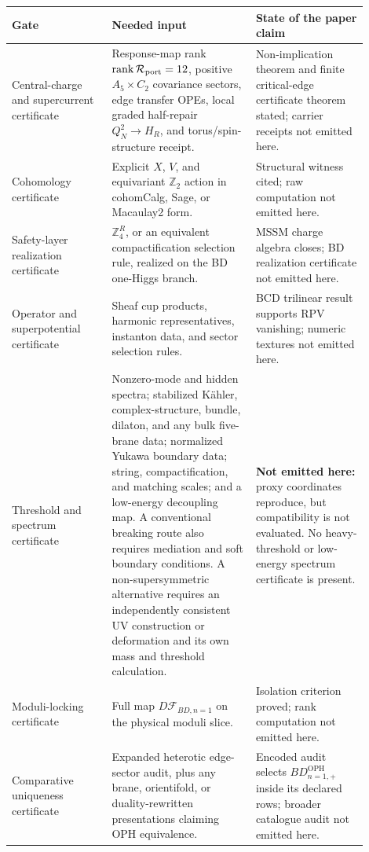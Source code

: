 \documentclass[11pt]{article}
\theoremstyle{remark}
\theoremstyle{plain}
\newcommand{\OPH}{\mathrm{OPH}}
\newcommand{\Z}{\mathbb Z}
\newcommand{\calF}{\mathcal F}
\newcommand{\calR}{\mathcal R}
\newcommand{\ZfourR}{\mathbb Z_4^R}
\begin{document}
\begin{longtable}{p{0.25\linewidth}p{0.36\linewidth}p{0.29\linewidth}}
\toprule
\textbf{Gate} & \textbf{Needed input} & \textbf{State of the paper claim} \\
\midrule
Central-charge and supercurrent certificate & Response-map rank
\(\operatorname{rank}\calR_{\rm port}=12\), positive \(A_5\times C_2\) covariance sectors, edge
transfer OPEs, local graded half-repair \(Q_N^2\to H_R\), and torus/spin-structure receipt. &
Non-implication theorem and finite critical-edge certificate theorem stated; carrier receipts not
emitted here. \\
Cohomology certificate & Explicit \(X\), \(V\), and equivariant \(\Z_2\) action in
cohomCalg, Sage, or Macaulay2 form. & Structural witness cited; raw computation not emitted here. \\
Safety-layer realization certificate & \(\ZfourR\), or an equivalent compactification selection rule,
realized on the BD one-Higgs branch. & MSSM charge algebra closes; BD realization certificate not emitted here. \\
Operator and superpotential certificate & Sheaf cup products, harmonic representatives, instanton
data, and sector selection rules. & BCD trilinear result supports RPV vanishing; numeric
textures not emitted here. \\
Threshold and spectrum certificate & Nonzero-mode and hidden spectra; stabilized K\"ahler,
complex-structure, bundle, dilaton, and any bulk five-brane data; normalized Yukawa boundary
data; string, compactification, and matching scales; and a low-energy decoupling map. A conventional breaking route also requires mediation and soft
boundary conditions. A non-supersymmetric alternative requires an independently consistent UV
construction or deformation and its own mass and threshold calculation. & \textbf{Not emitted
here:} proxy coordinates reproduce, but compatibility is not evaluated. No heavy-threshold or
low-energy spectrum certificate is present. \\
Moduli-locking certificate & Full map \(D\calF_{BD,n=1}\) on the physical moduli slice. & Isolation
criterion proved; rank computation not emitted here. \\
Comparative uniqueness certificate & Expanded heterotic edge-sector audit, plus any brane,
orientifold, or duality-rewritten presentations claiming OPH equivalence. & Encoded audit selects
\(BD_{n=1,+}^{\OPH}\) inside its declared rows; broader catalogue audit not emitted here. \\
\bottomrule
\end{longtable}
\end{document}
